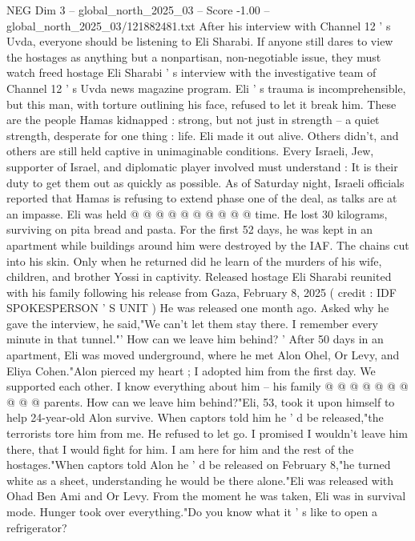 \begin{textsample}{NEG Dim 3 – global\_north\_2025\_03 – Score -1.00 – global\_north\_2025\_03/121882481.txt}  \label{ex:f3_neg_437}
After his interview with Channel 12 ' s Uvda, everyone should be listening to Eli Sharabi.
If anyone still dares to view the hostages as anything but a nonpartisan, non-negotiable issue, they must watch freed hostage Eli Sharabi ' s interview with the investigative team of Channel 12 ' s Uvda news magazine program.
Eli ' s trauma is incomprehensible, but this man, with torture outlining his face, refused to let it break him.
These are the people Hamas kidnapped : strong, but not just in strength -- a quiet strength, desperate for one thing : life.
Eli made it out alive.
Others didn't, and others are still held captive in unimaginable conditions.
Every Israeli, Jew, supporter of Israel, and diplomatic player involved must understand : It is their duty to get them out as quickly as possible.
As of Saturday night, Israeli officials reported that Hamas is refusing to extend phase one of the deal, as talks are at an impasse.
Eli was held @ @ @ @ @ @ @ @ @ @ time.
He lost 30 kilograms, surviving on pita bread and pasta.
For the first 52 days, he was kept in an apartment while buildings around him were destroyed by the IAF.
The chains cut into his skin.
Only when he returned did he learn of the murders of his wife, children, and brother Yossi in captivity.
Released hostage Eli Sharabi reunited with his family following his release from Gaza, February 8, 2025 ( credit : IDF SPOKESPERSON ' S UNIT ) He was released one month ago.
Asked why he gave the interview, he said,"We can't let them stay there.
I remember every minute in that tunnel."' How can we leave him behind? ' After 50 days in an apartment, Eli was moved underground, where he met Alon Ohel, Or Levy, and Eliya Cohen."Alon pierced my heart ; I adopted him from the first day.
We supported each other.
I know everything about him -- his family @ @ @ @ @ @ @ @ @ @ parents.
How can we leave him behind?"Eli, 53, took it upon himself to help 24-year-old Alon survive.
When captors told him he ' d be released,"the terrorists tore him from me.
He refused to let go.
I promised I wouldn't leave him there, that I would fight for him.
I am here for him and the rest of the hostages."When captors told Alon he ' d be released on February 8,"he turned white as a sheet, understanding he would be there alone."Eli was released with Ohad Ben Ami and Or Levy.
From the moment he was taken, Eli was in survival mode.
Hunger took over everything."Do you know what it ' s like to open a refrigerator?

\end{textsample}
